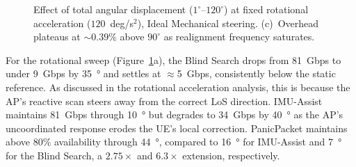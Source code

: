 \documentclass[fleqn,10pt]{wlscirep}
\newcommand{\legline}[2]{%
    \tikz[Blind Search=-0.5ex]{
        \draw[#1, #2, line width=1.5pt] (0,0) -- (0.5,0);
    }%
}
\begin{document}
\begin{figure}[ht!]
    
    
    \caption{Effect of total angular displacement ($1^\circ$--$120^\circ$) at fixed rotational acceleration ($120$~deg/s$^2$), Ideal Mechanical steering. (c)~Overhead plateaus at ${\sim}0.39\%$ above $90^\circ$ as realignment frequency saturates.}
    \label{fig:angle_effects}
\end{figure}

For the rotational sweep (Figure~\ref{fig:angle_effects}a), the Blind Search drops from \SI{81}{Gbps} to under \SI{9}{Gbps} by \SI{35}{\degree} and settles at $\approx$\SI{5}{Gbps}, consistently below the static reference. As discussed in the rotational acceleration analysis, this is because the AP's reactive scan steers away from the correct LoS direction. IMU-Assist maintains \SI{81}{Gbps} through \SI{10}{\degree} but degrades to \SI{34}{Gbps} by \SI{40}{\degree} as the AP's uncoordinated response erodes the UE's local correction. PanicPacket maintains above 80\% availability through \SI{44}{\degree}, compared to \SI{16}{\degree} for IMU-Assist and \SI{7}{\degree} for the Blind Search, a $2.75\times$ and $6.3\times$ extension, respectively.
\end{document}
